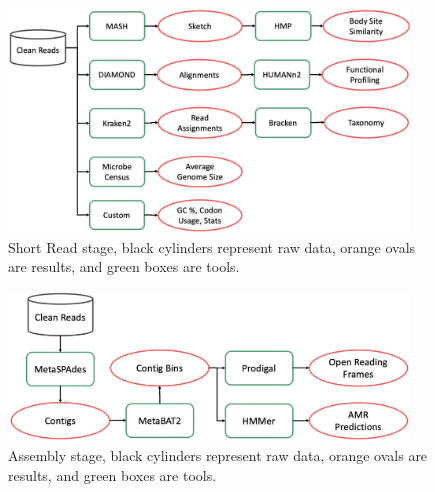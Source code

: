 \begin{figure}
  \begin{center}
    \includegraphics[width=0.95\textwidth]{figs/sfig_sr.jpeg}
	\caption{\small{
	    Short Read stage, black cylinders represent raw data, orange ovals are results, and green boxes are tools.
	}}
    \label{fig:sr}
  \end{center}
\end{figure}

\begin{figure}
  \begin{center}
    \includegraphics[width=0.95\textwidth]{figs/sfig_assembly.jpeg}
	\caption{\small{
	    Assembly stage, black cylinders represent raw data, orange ovals are results, and green boxes are tools.
	}}
    \label{fig:assembly}
  \end{center}
\end{figure}

